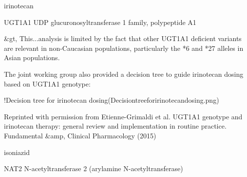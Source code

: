 \documentclass{resume} %
\begin{document}
\begin{rSection}{ irinotecan }
\begin{rSubsection}{ UGT1A1 }{ UDP glucuronosyltransferase 1 family, polypeptide A1 }{}{}
 \newline
\item &gt,  This...analysis is limited by the fact that other UGT1A1 deficient variants are relevant in non-Caucasian populations, particularly the *6 and *27 alleles in Asian populations.
 \newline
\item The joint working group also provided a decision tree to guide irinotecan dosing based on UGT1A1 genotype:
 \newline
\item !Decision tree for irinotecan dosing(Decisiontreeforirinotecandosing.png)
 \newline
\item Reprinted with permission from Etienne-Grimaldi et al. UGT1A1 genotype and irinotecan therapy: general review and implementation in routine practice. Fundamental &amp,  Clinical Pharmacology (2015) \newline
\vspace{1pt}\newline


\end{rSubsection}

\end{rSection}\begin{rSection}{ isoniazid }
\item[]
\begin{rSubsection}{ NAT2 }{ N-acetyltransferase 2 (arylamine N-acetyltransferase) }{}{}
\item[]


\end{rSubsection}


\end{rSection}
\end{document}
